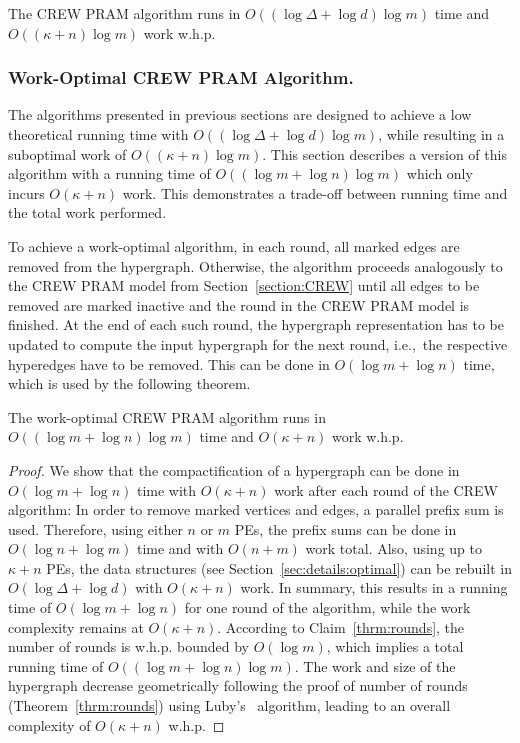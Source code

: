 \documentclass[runningheads]{llncs}
\begin{document}
\begin{theorem}
        The CREW PRAM algorithm runs in $O((\log{\Delta} + \log{d}) \log{m})$ time and $O((\kappa + n) \log{m})$ work \hbox{w.h.p.}
\end{theorem}

\subsubsection{Work-Optimal CREW PRAM Algorithm.}\label{sec:work_optimal_crew_algorithm}
The algorithms presented in previous sections are designed to achieve a low theoretical running time with $O((\log{\Delta} + \log{d}) \log{m})$, while resulting in a suboptimal work of $O((\kappa + n) \log{m})$. This section describes a version of this algorithm with a running time of $O((\log{m} + \log{n}) \log{m})$ which only incurs $O(\kappa + n)$ work. This demonstrates a trade-off between running time and the total work performed.

To achieve a work-optimal algorithm, in each round, all marked edges are removed from the hypergraph. Otherwise, the algorithm proceeds analogously to the CREW PRAM model from Section~\ref{section:CREW} until all edges to be removed are marked inactive and the round in the CREW PRAM model is finished. At the end of each such round, the hypergraph representation has to be updated to compute the input hypergraph for the next round, i.e.,~the respective hyperedges have to be removed. This can be done in $O(\log{m} + \log{n})$ time, which is used by the following theorem.

\begin{theorem}
        The work-optimal CREW PRAM algorithm runs in $O((\log{m} + \log{n}) \log{m})$ time and $O(\kappa + n)$ work \hbox{w.h.p.} %
\end{theorem}
\begin{proof}
    We show that the compactification of a hypergraph can be done in $O(\log{m}+\log{n})$ time with $O(\kappa + n)$ work after each round of the CREW algorithm:
        In order to remove marked vertices and edges, a parallel prefix sum is used. Therefore, using either $n$ or $m$ PEs, the prefix sums can be done in $O(\log{n} + \log{m})$ time and with $O(n + m)$ work total. Also, using up to $\kappa + n$ PEs, the data structures (see Section~\ref{sec:details:optimal}) can be rebuilt in $O(\log{\Delta} + \log{d})$ with $O(\kappa + n)$ work.
        In summary, this results in a running time of $O(\log{m} + \log{n})$ for one round of the algorithm, while the work complexity remains at $O(\kappa + n)$.
        According to Claim~\ref{thrm:rounds}, the number of rounds is w.h.p. bounded by $O(\log{m})$, which implies a total running time of $O((\log{m} + \log{n}) \log{m})$.
        The work and size of the hypergraph decrease geometrically following the proof of number of rounds (Theorem~\ref{thrm:rounds}) using Luby's~\cite{luby1985simple} algorithm, leading to an overall complexity of $O(\kappa + n)$ w.h.p.
\end{proof}
\end{document}
